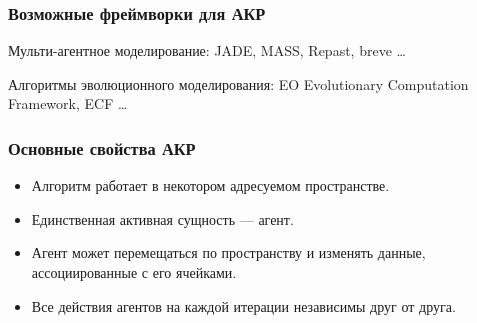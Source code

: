 \documentclass[14pt]{beamer}
\begin{document}

\begin{frame}
    \frametitle{Возможные фреймворки для АКР}
        Мульти-агентное моделирование: JADE, MASS, Repast, breve \ldots
        \vspace{1cm}        
        
        Алгоритмы эволюционного моделирования:  EO Evolutionary Computation Framework, ECF \ldots
\end{frame}


\begin{frame}
    \frametitle{Основные свойства АКР}
    \begin{itemize}
        \item Алгоритм работает в некотором адресуемом пространстве.
        \item Единственная активная сущность --- агент.
        \item Агент может перемещаться по пространству и изменять данные, ассоциированные с его ячейками.
        \item Все действия агентов на каждой итерации независимы друг от друга.
    \end{itemize}
\end{frame}
\end{document}
